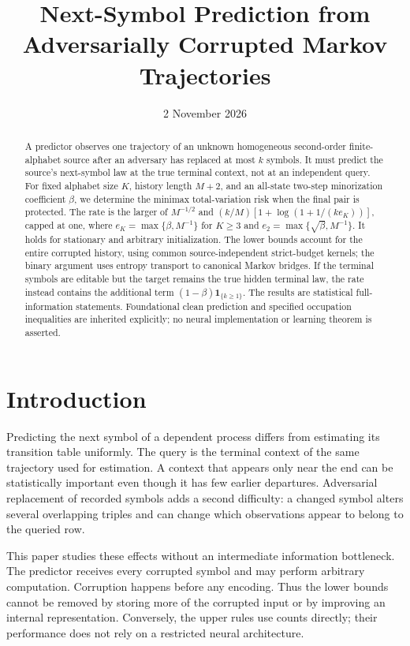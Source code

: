 \documentclass[11pt]{article}
\title{Next-Symbol Prediction from Adversarially Corrupted Markov Trajectories}
\author{}
\date{2 November 2026}
\theoremstyle{remark}\newtheorem{remark}[theorem]{Remark}
\newcommand{\1}{\mathbf 1}
\begin{document}
\maketitle
\begin{abstract}
A predictor observes one trajectory of an unknown homogeneous second-order finite-alphabet source after an adversary has replaced at most $k$ symbols. It must predict the source's next-symbol law at the true terminal context, not at an independent query. For fixed alphabet size $K$, history length $M+2$, and an all-state two-step minorization coefficient $\beta$, we determine the minimax total-variation risk when the final pair is protected. The rate is the larger of $M^{-1/2}$ and $(k/M)[1+\log(1+1/(ke_K))]$, capped at one, where $e_K=\max\{\beta,M^{-1}\}$ for $K\ge3$ and $e_2=\max\{\sqrt\beta,M^{-1}\}$. It holds for stationary and arbitrary initialization. The lower bounds account for the entire corrupted history, using common source-independent strict-budget kernels; the binary argument uses entropy transport to canonical Markov bridges. If the terminal symbols are editable but the target remains the true hidden terminal law, the rate instead contains the additional term $(1-\beta)\1_{\{k\ge1\}}$. The results are statistical full-information statements. Foundational clean prediction and specified occupation inequalities are inherited explicitly; no neural implementation or learning theorem is asserted.
\end{abstract}
\tableofcontents
\newpage
\section{Introduction}
Predicting the next symbol of a dependent process differs from estimating its transition table uniformly. The query is the terminal context of the same trajectory used for estimation. A context that appears only near the end can be statistically important even though it has few earlier departures. Adversarial replacement of recorded symbols adds a second difficulty: a changed symbol alters several overlapping triples and can change which observations appear to belong to the queried row.

This paper studies these effects without an intermediate information bottleneck. The predictor receives every corrupted symbol and may perform arbitrary computation. Corruption happens before any encoding. Thus the lower bounds cannot be removed by storing more of the corrupted input or by improving an internal representation. Conversely, the upper rules use counts directly; their performance does not rely on a restricted neural architecture.
\end{document}
